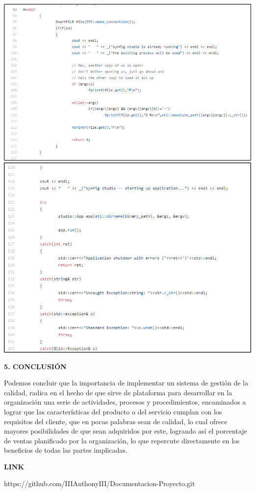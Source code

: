 \documentclass[10pt,a4paper]{article}
\begin{document}
\begin{center}
\includegraphics[scale=1]{Imagen9.png}
\includegraphics[scale=1]{Imagen10.png}
\end{center}
\vspace{\baselineskip}
\textbf{5. CONCLUSIÓN}
\vspace{\baselineskip}

Podemos concluir que la importancia de implementar un sistema de gestión de la calidad, radica en el hecho de que sirve de plataforma para desarrollar en la organización una serie de actividades, procesos y procedimientos, encaminados a lograr que las características del producto o del servicio cumplan con los requisitos del cliente, que en pocas palabras sean de calidad, lo cual ofrece mayores posibilidades de que sean adquiridos por este, logrando así el porcentaje de ventas planificado por la organización, lo que repercute directamente en los beneficios de todas las partes implicadas.

\vspace{\baselineskip}
\textbf{LINK}

https://github.com/IIIAnthonyIII/Documentacion-Proyecto.git
\end{document}
